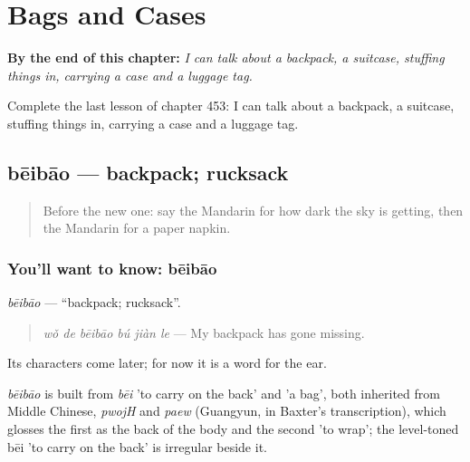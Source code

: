 
\chapter{Bags and Cases}
\label{ch:zh-bags-and-cases}

\begin{chapteropening}
\textbf{By the end of this chapter:} \emph{I can talk about a backpack, a suitcase, stuffing things in, carrying a case and a luggage tag.}

Complete the last lesson of chapter 453: I can talk about a backpack, a suitcase, stuffing things in, carrying a case and a luggage tag.
\end{chapteropening}

\section[bēibāo]{bēibāo — backpack; rucksack}

\label{lesson:ZH-C453-beibao}



\begin{quote}
Before the new one: say the Mandarin for how dark the sky is getting, then the Mandarin for a paper napkin.
\end{quote}

\subsection*{You'll want to know: bēibāo}
\emph{bēibāo} — \textquotedblleft{}backpack; rucksack\textquotedblright{}.

\begin{quote}
\emph{wǒ de bēibāo bú jiàn le} — My backpack has gone missing.
\end{quote}

Its characters come later; for now it is a word for the ear.

\begin{cousinweb}
\emph{bēibāo} is built from \emph{bēi} 'to carry on the back' and  'a bag', both inherited from Middle Chinese, \emph{pwojH} and \emph{paew} (Guangyun, in Baxter's transcription), which glosses the first as the back of the body and the second 'to wrap'; the level-toned bēi 'to carry on the back' is irregular beside it.
\end{cousinweb}


